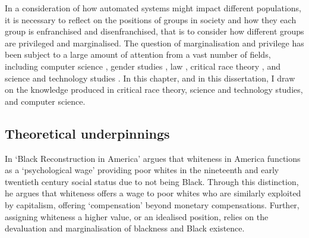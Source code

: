 In a consideration of how automated systems might impact different populations, it is necessary to reflect on the positions of groups in society and how they each group is enfranchised and disenfranchised, that is to consider how different groups are privileged and marginalised.
The question of marginalisation and privilege has been subject to a large amount of attention from a vast number of fields, including computer science \citep{Bender:2021,Dinan:2020,Mitchell:2019}, gender studies \citep{McIntosh:1988,Mohanty:1984}, law \citep{Crenshaw:1989}, critical race theory \citep{Benjamin:2019,Myers:2019}, and science and technology studies \citep{Haraway:1988}.
In this chapter, and in this dissertation, I draw on the knowledge produced in critical race theory, science and technology studies, and computer science.

\subsection{Theoretical underpinnings}

In `Black Reconstruction in America' \citet{Dubois:1935} argues that whiteness in America functions as a `psychological wage' providing poor whites in the nineteenth and early twentieth century social status due to not being Black. Through this distinction, he argues that whiteness offers a wage to poor whites who are similarly exploited by capitalism, offering `compensation' beyond monetary compensations. Further, assigning whiteness a higher value, or an idealised position, relies on the devaluation and marginalisation of blackness and Black existence.


